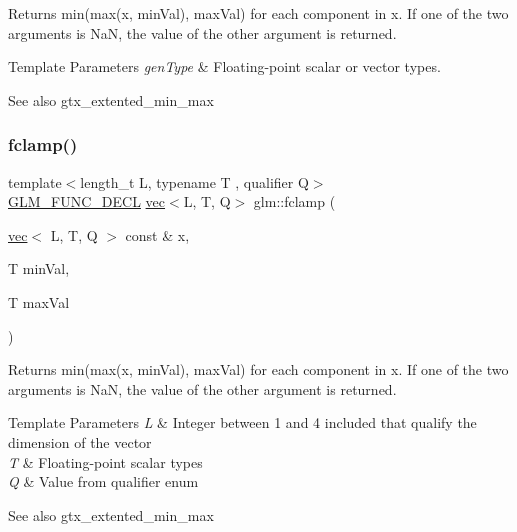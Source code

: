 Returns min(max(x, min\+Val), max\+Val) for each component in x. If one of the two arguments is NaN, the value of the other argument is returned.


\begin{DoxyTemplParams}{Template Parameters}
{\em gen\+Type} & Floating-\/point scalar or vector types.\\
\hline
\end{DoxyTemplParams}
\begin{DoxySeeAlso}{See also}
gtx\+\_\+extented\+\_\+min\+\_\+max 
\end{DoxySeeAlso}
\mbox{\label{group__gtx__extended__min__max_ga60796d08903489ee185373593bc16b9d}} 
\subsubsection{\texorpdfstring{fclamp()}{fclamp()}\hspace{0.1cm}{\footnotesize\ttfamily [2/3]}}
{\footnotesize\ttfamily template$<$length\+\_\+t L, typename T , qualifier Q$>$ \\
\mbox{\hyperlink{setup_8hpp_ab2d052de21a70539923e9bcbf6e83a51}{G\+L\+M\+\_\+\+F\+U\+N\+C\+\_\+\+D\+E\+CL}} \mbox{\hyperlink{structglm_1_1vec}{vec}}$<$L, T, Q$>$ glm\+::fclamp (\begin{DoxyParamCaption}\item[{\mbox{\hyperlink{structglm_1_1vec}{vec}}$<$ L, T, Q $>$ const \&}]{x,  }\item[{T}]{min\+Val,  }\item[{T}]{max\+Val }\end{DoxyParamCaption})}

Returns min(max(x, min\+Val), max\+Val) for each component in x. If one of the two arguments is NaN, the value of the other argument is returned.


\begin{DoxyTemplParams}{Template Parameters}
{\em L} & Integer between 1 and 4 included that qualify the dimension of the vector \\
\hline
{\em T} & Floating-\/point scalar types \\
\hline
{\em Q} & Value from qualifier enum\\
\hline
\end{DoxyTemplParams}
\begin{DoxySeeAlso}{See also}
gtx\+\_\+extented\+\_\+min\+\_\+max 
\end{DoxySeeAlso}
\mbox{\label{group__gtx__extended__min__max_ga5c15fa4709763c269c86c0b8b3aa2297}} 
